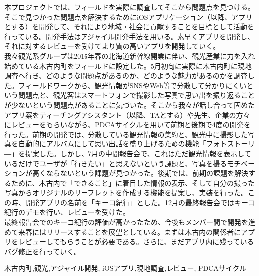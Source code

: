 \begin{jabstract}
\quad 本プロジェクトでは、フィールドを実際に調査してそこから問題点を見つける。そこで見つかった問題点を解決するためにiOSアプリケーション（以降、アプリとする）を開発して、それにより地域・社会に貢献することを目標として活動を行っている。開発手法はアジャイル開発手法を用いる。素早くアプリを開発し、それに対するレビューを受けてより質の高いアプリを開発していく。\\
\quad 我々観光系グループは2016年春の北海道新幹線開業に伴い、観光産業に力を入れ始めている木古内町をフィールドに設定した。5月初旬に実際に木古内町に現地調査へ行き、どのような問題点があるのか、どのような魅力があるのかを調査した。フィールドワークから、観光情報がSNSやWeb等で分散して分かりにくいという問題点と、観光客はスマートフォンで撮影した写真で思い出を振り返ることが少ないという問題点があることに気づいた。そこから我々が話し合って固めたアプリ案をティーチングアシスタント（以降、TAとする）や先生、企業の方々にレビューをもらいながら、PDCAサイクルを用いて前期と後期で4度の開発を行った。前期の開発では、分散している観光情報の集約と、観光中に撮影した写真を自動的にアルバムにして思い出話を盛り上げるための機能「フォトストーリ―」を提案した。しかし、7月の中間報告会で、これはただ観光情報を表示しているだけでユーザが「行きたい」と思えないという課題と、写真を撮るモチベーションが高くならないという課題が見つかった。後期では、前期の課題を解決するために、木古内で「できること」に着目した情報の表示、そして自分の撮った写真からオリジナルのリーフレットを作成する機能を提案し、実装を行った。この時、開発アプリの名前を「キーコ紀行」とした。12月の最終報告会ではキーコ紀行のデモを行い、レビューを受けた。\\
\quad 最終報告会でのキーコ紀行の評価が高かったため、今後もメンバー間で開発を進めて来春にはリリースすることを展望としている。まずは木古内の関係者にアプリをレビューしてもらうことが必要である。さらに、まだアプリ内に残っているバグ修正を行っていく。\\

\begin{jkeyword}
木古内町,観光,アジャイル開発, iOSアプリ,現地調査,レビュー, PDCAサイクル
\end{jkeyword}
\end{jabstract}

